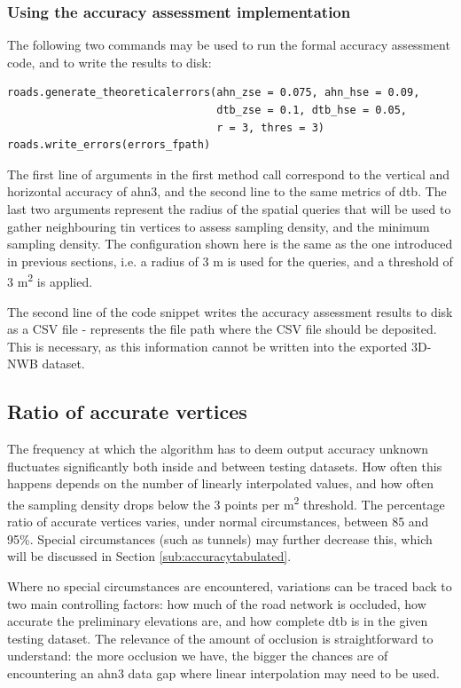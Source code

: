 \subsubsection{Using the accuracy assessment implementation}

The following two commands may be used to run the formal accuracy assessment code, and to write the results to disk:

\begin{verbatim}
roads.generate_theoreticalerrors(ahn_zse = 0.075, ahn_hse = 0.09,
                                 dtb_zse = 0.1, dtb_hse = 0.05,
                                 r = 3, thres = 3)
roads.write_errors(errors_fpath)
\end{verbatim}

The first line of arguments in the first method call correspond to the vertical and horizontal accuracy of \ac{ahn3}, and the second line to the same metrics of \ac{dtb}. The last two arguments represent the radius of the spatial queries that will be used to gather neighbouring \ac{tin} vertices to assess sampling density, and the minimum sampling density. The configuration shown here is the same as the one introduced in previous sections, i.e. a radius of 3 m is used for the queries, and a threshold of 3 m\textsuperscript{2} is applied.

The second line of the code snippet writes the accuracy assessment results to disk as a CSV file -  represents the file path where the CSV file should be deposited. This is necessary, as this information cannot be written into the exported 3D-NWB dataset.

\subsection{Ratio of accurate vertices}
\label{sub:completeness}

The frequency at which the algorithm has to deem output accuracy unknown fluctuates significantly both inside and between testing datasets. How often this happens depends on the number of linearly interpolated values, and how often the sampling density drops below the 3 points per m\textsuperscript{2} threshold. The percentage ratio of accurate vertices varies, under normal circumstances, between 85 and 95\%. Special circumstances (such as tunnels) may further decrease this, which will be discussed in Section \ref{sub:accuracytabulated}.

Where no special circumstances are encountered, variations can be traced back to two main controlling factors: how much of the road network is occluded, how accurate the preliminary elevations are, and how complete \ac{dtb} is in the given testing dataset. The relevance of the amount of occlusion is straightforward to understand: the more occlusion we have, the bigger the chances are of encountering an \ac{ahn3} data gap where linear interpolation may need to be used.

